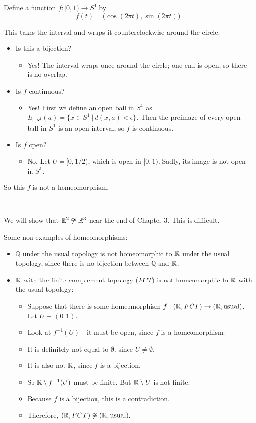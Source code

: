 \begin{example}
 Define a function $f:[0,1)\to S^1$ by
\[ f(t) = \big( \cos(2\pi t), \sin(2\pi t)\big) \]
\end{example}
This takes the interval and wraps it counterclockwise around the circle.
\begin{itemize}
\item Is this a bijection?
\begin{itemize}
\item Yes!  The interval wraps once around the circle; one end is open, so there is no overlap.
\end{itemize}

\item Is $f$ continuous?
\begin{itemize}
\item Yes!  First we define an open ball in $S^1$ as $B_{\epsilon, S^1}(a) = \{x\in S^1\ |\ d(x,a) < \epsilon\}$.  Then the preimage of every open ball in $S^1$ is an open interval, so $f$ is continuous.  
\end{itemize}


\item Is $f$ open?
\begin{itemize}
\item No.  Let $U = [0, 1/2)$, which is open in $[0,1)$.  Sadly, its image is not open in $S^1$.
\end{itemize}

\end{itemize}
So this $f$ is not a homeomorphism.

\mbox{ }

We will show that $\mathbb R^2 \not\cong \mathbb R^3$ near the end of Chapter 3. This is difficult.

\begin{example}Some non-examples of homeomorphisms:\end{example}
\begin{itemize}
\item $\mathbb Q$ under the usual topology is not homeomorphic to $\mathbb R$ under the usual topology, since there is no bijection between $\mathbb Q$ and $\mathbb R$.
\item $\mathbb R$ with the finite-complement topology ($FCT$) is not homeomorphic to $\mathbb R$ with the usual topology:
\begin{itemize}
\item Suppose that there is some homeomorphism $f:(\mathbb R, FCT)\to(\mathbb R,\text{usual})$.  Let $U = (0,1)$.
\item Look at $f^{-1}(U)$ - it must be open, since $f$ is a homeomorphism.
\item It is definitely not equal to $\emptyset$, since $U\ne\emptyset$.
\item It is also not $\mathbb R$, since $f$ is a bijection.
\item So $\mathbb R\setminus f^{-1}(U)$ must be finite.  But $\mathbb R\setminus U$ is not finite.
\item Because $f$ is a bijection, this is a contradiction.
\item Therefore, $(\mathbb R, FCT) \not\cong (\mathbb R, \text{usual})$.
\end{itemize}
\end{itemize}
